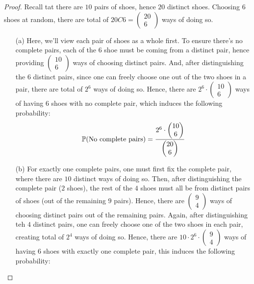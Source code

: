 \documentclass{article}
\begin{document}
\begin{proof}
    
    Recall tat there are $10$ pairs of shoes, hence $20$ distinct shoes. Choosing $6$ shoes at random, there are total of $20 C 6=\begin{pmatrix}20\\6\end{pmatrix}$ ways of doing so.

    \begin{itemize}
        \item[(a)] Here, we'll view each pair of shoes as a whole first. To ensure there's no complete pairs, each of the $6$ shoe must be coming from a distinct pair, hence providing $\begin{pmatrix}10\\6\end{pmatrix}$ ways of choosing distinct pairs. And, after distinguishing the $6$ distinct pairs, since one can freely choose one out of the two shoes in a pair, there are total of $2^6$ ways of doing so. Hence, there are $2^6\cdot \begin{pmatrix}10\\6\end{pmatrix}$ ways of having $6$ shoes with no complete pair, which induces the following probability:
        \begin{align}
            \mathbb{P}(\textmd{No complete pairs})=\frac{2^6\cdot \begin{pmatrix}10\\6\end{pmatrix}}{\begin{pmatrix}20\\6\end{pmatrix}}
        \end{align}
        \item[(b)] For exactly one complete pairs, one must first fix the complete pair, where there are $10$ distinct ways of doing so. Then, after distinguishing the complete pair ($2$ shoes), the rest of the $4$ shoes must all be from distinct pairs of shoes (out of the remaining $9$ pairs). Hence, there are $\begin{pmatrix}9\\4\end{pmatrix}$ ways of choosing distinct pairs out of the remaining pairs. Again, after distinguishing teh $4$ distinct pairs, one can freely choose one of the two shoes in each pair, creating total of $2^4$ ways of doing so. Hence, there are $10\cdot 2^6\cdot \begin{pmatrix}9\\4\end{pmatrix}$ ways of having $6$ shoes with exactly one complete pair, this induces the following probability:

\end{itemize}
\end{proof}
\end{document}
